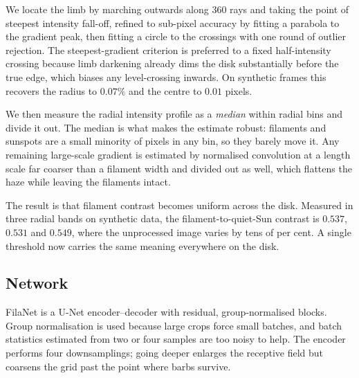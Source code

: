 \documentclass[11pt]{article}
\begin{document}
We locate the limb by marching outwards along 360 rays and taking the point of
steepest intensity fall-off, refined to sub-pixel accuracy by fitting a
parabola to the gradient peak, then fitting a circle to the crossings with one
round of outlier rejection. The steepest-gradient criterion is preferred to a
fixed half-intensity crossing because limb darkening already dims the disk
substantially before the true edge, which biases any level-crossing inwards.
On synthetic frames this recovers the radius to $0.07\%$ and the centre to
$0.01$ pixels.

We then measure the radial intensity profile as a \emph{median} within radial
bins and divide it out. The median is what makes the estimate robust:
filaments and sunspots are a small minority of pixels in any bin, so they
barely move it. Any remaining large-scale gradient is estimated by normalised
convolution at a length scale far coarser than a filament width and divided out
as well, which flattens the haze while leaving the filaments intact.

The result is that filament contrast becomes uniform across the disk. Measured
in three radial bands on synthetic data, the filament-to-quiet-Sun contrast is
$0.537$, $0.531$ and $0.549$, where the unprocessed image varies by tens of per
cent. A single threshold now carries the same meaning everywhere on the disk.

\subsection{Network}

FilaNet is a U-Net \cite{unet2015} encoder--decoder with residual,
group-normalised blocks. Group normalisation is used because large crops force
small batches, and batch statistics estimated from two or four samples are too
noisy to help. The encoder performs four downsamplings; going deeper enlarges
the receptive field but coarsens the grid past the point where barbs survive.
\end{document}
